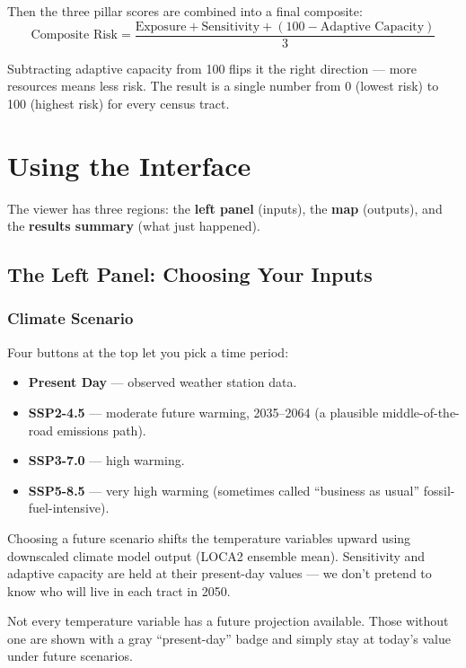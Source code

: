 \documentclass[11pt]{article}
\begin{document}
Then the three pillar scores are combined into a final composite:
\[
\text{Composite Risk} = \frac{\text{Exposure} + \text{Sensitivity} + (100 - \text{Adaptive Capacity})}{3}
\]

Subtracting adaptive capacity from 100 flips it the right direction ---
more resources means less risk. The result is a single number from 0
(lowest risk) to 100 (highest risk) for every census tract.

\section{Using the Interface}
\label{sec:interface}

The viewer has three regions: the \textbf{left panel} (inputs), the
\textbf{map} (outputs), and the \textbf{results summary} (what just
happened).

\subsection{The Left Panel: Choosing Your Inputs}

\subsubsection*{Climate Scenario}
Four buttons at the top let you pick a time period:
\begin{itemize}[leftmargin=*]
  \item \textbf{Present Day} --- observed weather station data.
  \item \textbf{SSP2-4.5} --- moderate future warming, 2035--2064 (a
        plausible middle-of-the-road emissions path).
  \item \textbf{SSP3-7.0} --- high warming.
  \item \textbf{SSP5-8.5} --- very high warming (sometimes called
        ``business as usual'' fossil-fuel-intensive).
\end{itemize}

Choosing a future scenario shifts the temperature variables upward using
downscaled climate model output (LOCA2 ensemble mean). Sensitivity and
adaptive capacity are held at their present-day values --- we don't
pretend to know who will live in each tract in 2050.

\begin{cautionbox}
Not every temperature variable has a future projection available. Those
without one are shown with a gray ``present-day'' badge and simply stay
at today's value under future scenarios.
\end{cautionbox}
\end{document}

